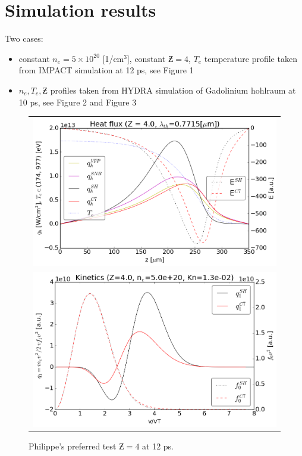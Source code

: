 \documentclass[preprint,12pt]{elsarticle}
\newcommand{\figref}[1]{FIG.~\ref{#1}}
\begin{document}
\section{Simulation results}\label{sec:results}
Two cases:
\begin{itemize}
  \item constant $n_e = 5\times10^{20}$ [1/cm$^3$], constant $\Zbar = 4$, 
  $T_e$ temperature profile taken from IMPACT simulation at 12 ps, see Figure 1
  \item $n_e, T_e, \Zbar$ profiles taken from HYDRA simulation of Gadolinium
  hohlraum at 10 ps, see Figure 2 and Figure 3
\end{itemize}
\begin{figure}[tbh]
  \begin{center}
    \begin{tabular}{c}
      \includegraphics[width=1.0\textwidth]{../VFPdata/C7_heatflux_12ps.png} \\ 
      \includegraphics[width=1.0\textwidth]{../VFPdata/C7_kinetics_12ps.png}
    \end{tabular}
  \caption{
  Philippe's preferred test $\Zbar = 4$ at 12 ps.  
  }
  \end{center}
  \label{fig:Philippe_VFP_12ps}
\end{figure}
\end{document}
